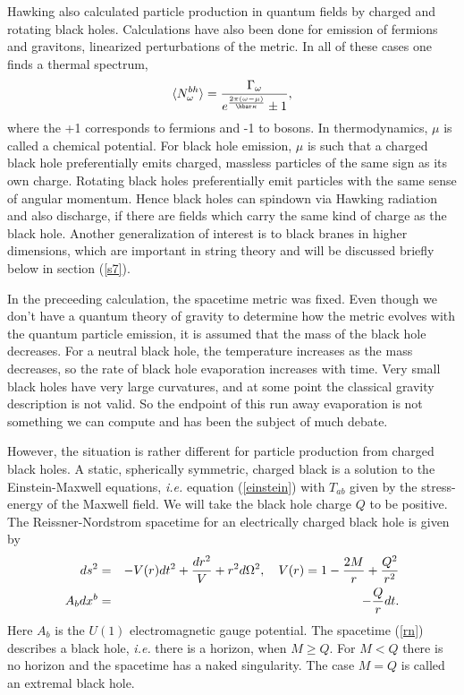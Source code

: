 \documentclass[12pt]{article}
\newcommand{\be}{\begin{equation}}
\newcommand{\ee}{\end{equation}}
\def\bena{\begin{eqnarray}}
\def\eena{\end{eqnarray}}
\begin{document}
Hawking also calculated particle production in quantum fields by charged
and rotating black holes. Calculations have also been done for emission
of fermions and gravitons, linearized perturbations of the metric.  In all
of these
cases one finds a thermal spectrum,
%
\be\label{thermal}\langle N_\omega^{bh} \rangle = {\Gamma_{\omega} \over e^{ {2\pi
(\omega -\mu ) \over
\hbar \kappa} }\pm 1},\ee
%
where the +1 corresponds to fermions and -1 to bosons. In thermodynamics,
$\mu$ is  called a chemical potential. For black hole emission, $\mu$ is such
that a charged black hole preferentially emits charged, massless particles
of the same sign as its own charge. Rotating black holes preferentially emit
particles with the same sense of angular momentum. Hence black holes
can spindown via Hawking radiation and also discharge, if there are fields
which carry the same kind of charge as the black hole.
Another generalization of interest is to black branes in higher dimensions,
which are important in string theory and will be discussed briefly below in
section (\ref{s7}).

In the preceeding calculation, the spacetime metric was fixed. Even though
we don't have a quantum theory of gravity to determine how
the metric evolves with the quantum particle emission, it is assumed that
the mass of the black hole decreases.  For a neutral black hole, the temperature
increases as the mass decreases, so the rate of black hole evaporation
increases with time.  Very small black holes have very large curvatures,
and at some point the classical gravity description is not valid. So
the endpoint of this run away evaporation is not something we can compute
and has been the
subject of much debate.

However, the situation is rather different for particle production
from charged black holes. A static, spherically symmetric, charged black is a
solution to the Einstein-Maxwell equations, {\it i.e.} equation
(\ref{einstein}) with $T_{ab}$ given by the
stress-energy of the Maxwell field.
We will take the black hole
charge $Q$ to be positive.  The Reissner-Nordstrom spacetime for an
electrically charged
black hole is given by
%
\bena\label{rn} ds^2  &= &-V(r)dt^2 +{dr^2 \over V} +r^2 d\Omega ^2,
\quad V(r) = 1-{2M\over r} +{Q^2 \over r^2}  \\
A_b dx^b &=&-{Q\over r}dt .\eena
%
Here $A_b$ is the $U(1)$ electromagnetic gauge potential. The spacetime
(\ref{rn})  describes
a black hole, {\it i.e.} there is a horizon, when $M\ge Q$.  For $M<Q$
there is no
horizon and the spacetime has a naked singularity. The case $M=Q$
is called an extremal black hole.
\end{document}
